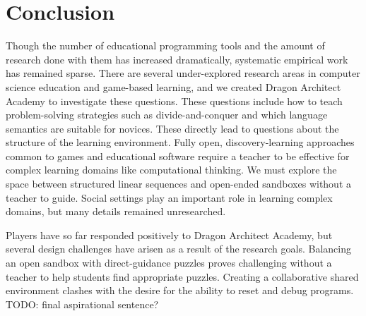 \documentclass{sig-alternate}
\newcommand{\TODO}[1]{{\color{red} TODO: #1}}
\newcommand{\gametitle}{{\color{RoyalPurple} Dragon Architect Academy}}
\begin{document}
\section{Conclusion}

Though the number of educational programming tools and the amount of research done with them has increased dramatically, systematic empirical work has remained sparse.
There are several under-explored research areas in computer science education and game-based learning, and we created \gametitle{} to investigate these questions.
These questions include how to teach problem-solving strategies such as divide-and-conquer and which language semantics are suitable for novices.
These directly lead to questions about the structure of the learning environment.
Fully open, discovery-learning approaches common to games and educational software require a teacher to be effective for complex learning domains like computational thinking.
We must explore the space between structured linear sequences and open-ended sandboxes without a teacher to guide.
Social settings play an important role in learning complex domains, but many details remained unresearched.

Players have so far responded positively to \gametitle{}, but several design challenges have arisen as a result of the research goals.
Balancing an open sandbox with direct-guidance puzzles proves challenging without a teacher to help students find appropriate puzzles.
Creating a collaborative shared environment clashes with the desire for the ability to reset and debug programs.
\TODO{final aspirational sentence?}



 
\end{document}
